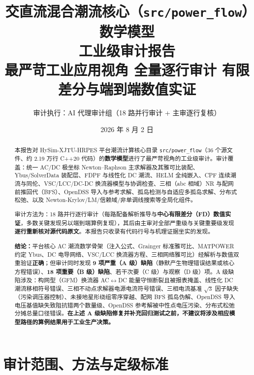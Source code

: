 \documentclass[11pt,a4paper,fontset=fandol]{ctexart}
\title{\textbf{交直流混合潮流核心（\texttt{src/power\_flow}）数学模型\\工业级审计报告}\\[0.5em]
\large 最严苛工业应用视角 \textbar{} 全量逐行审计 \textbar{} 有限差分与端到端数值实证}
\author{审计执行：AI 代理审计组（18 路并行审计 + 主审逐行复核）}
\date{2026 年 8 月 2 日}
\newcommand{\file}[1]{\texttt{#1}}
\begin{document}
\maketitle
\begin{center}
\end{center}

\begin{abstract}
\noindent
本报告对 HySim-XJTU-HRPES 平台潮流计算核心目录 \file{src/power\_flow}（36 个源文件、约 2.19 万行 C++20 代码）的\textbf{数学模型}进行了最严苛视角的工业级审计。审计覆盖：统一 AC/DC 极坐标 Newton--Raphson 主求解器及其雅可比装配、Ybus/SolverData 装配层、FDPF 与线性化 DC 潮流、HELM 全纯嵌入、CPF 连续潮流与同伦、VSC/LCC/DC-DC 换流器模型与协调检查、三相（abc 相域）NR 与配网前推回代（BFS）、OpenDSS 导入与参考求解、孤岛检测与自适应多孤岛求解、分布式松弛、以及 Newton-Krylov/LM/信赖域/非单调线搜索等全局化组件。

审计方法为：18 路并行逐行审计（每路配备解析推导与\textbf{中心有限差分（FD）数值实证}，多数关键发现另以端到端算例复现），其后由主审对全部严重级与关键重要级发现\textbf{逐行重新核对源代码原文}。本报告只收录有代码行号与机理证据坐实的发现。

\textbf{结论：}平台核心 AC 潮流数学骨架（注入公式、Grainger 标准雅可比、MATPOWER 约定 Ybus、DC 电导网络、VSC/LCC 换流器方程、三相网络雅可比）经解析与数值双重验证\textbf{正确}；但审计同时发现 \textbf{9 项严重（A 级）缺陷}（静默产生物理错误结果或核心方程错误）、\textbf{18 项重要（B 级）缺陷}、若干次要（C 级）与观察（D 级）项。A 级缺陷涉及：构网型（GFM）换流器 AC$\leftrightarrow$DC 能量守恒断裂且被报表掩盖、线性化 DC 潮流移相符号错误、三相不动点求解器电源电流符号错误、三相电流基准 $\sqrt{3}$ 因子缺失（污染调压器控制）、未接地星形绕组零序穿越、配网 BFS 孤岛伪解、OpenDSS 导入电压基值缺失致阻抗错两个数量级、OpenDSS 参考解被中性点电压污染、分布式松弛分摊总量口径错误。\textbf{在上述 A 级缺陷修复并补充回归测试之前，不建议将涉及相应模型路径的算例结果用于工业生产决策。}
\end{abstract}

\tableofcontents
\newpage

\section{审计范围、方法与定级标准}
\end{document}
